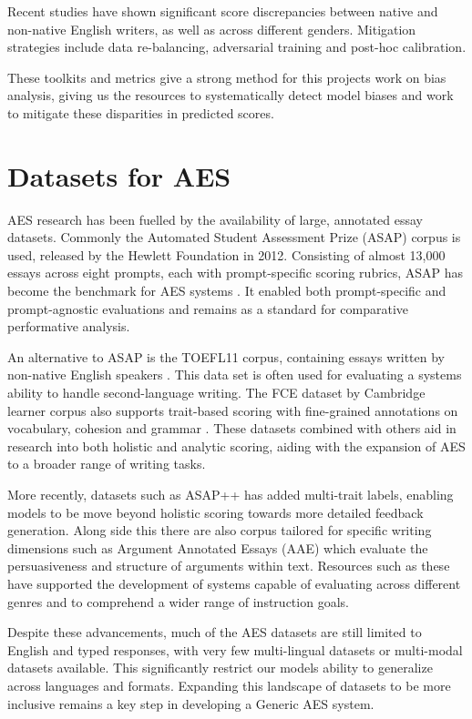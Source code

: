 \documentclass[10pt]{report}
\begin{document}
Recent studies have shown significant score discrepancies between native and non-native English writers, as well as across different genders\parencite{blodgett2020language}. Mitigation strategies include data re-balancing, adversarial training and post-hoc calibration.

These toolkits and metrics give a strong method for this projects work on bias analysis, giving us the resources to systematically detect model biases and work to mitigate these disparities in predicted scores.


\section{Datasets for AES}
AES research has been fuelled by the availability of large, annotated essay datasets. Commonly the Automated Student Assessment Prize (ASAP) corpus is used, released by the Hewlett Foundation in 2012. Consisting of almost 13,000 essays across eight prompts, each with prompt-specific scoring rubrics, ASAP has become the benchmark for AES systems \parencite{asap2012kaggle}. It enabled both prompt-specific and prompt-agnostic evaluations and remains as a standard for comparative performative analysis.

An alternative to ASAP is the TOEFL11 corpus, containing essays written by non-native English speakers \parencite{blanchard2013toefl}. This data set is often used for evaluating a systems ability to handle second-language writing. The FCE dataset by Cambridge learner corpus also supports trait-based scoring with fine-grained annotations on vocabulary, cohesion and grammar \parencite{Yannakoudakis2011}. These datasets combined with others aid in research into both holistic and analytic scoring, aiding with the expansion of AES to a broader range of writing tasks.

More recently, datasets such as ASAP++ has added multi-trait labels, enabling models to be move beyond holistic scoring towards more detailed feedback generation. Along side this there are also corpus tailored for specific writing dimensions such as Argument Annotated Essays (AAE) which evaluate the persuasiveness and structure of arguments within text. Resources such as these have supported the development of systems capable of evaluating across different genres and to comprehend a wider range of instruction goals.

Despite these advancements, much of the AES datasets are still limited to English and typed responses, with very few multi-lingual datasets or multi-modal datasets available. This significantly restrict our models ability to generalize across languages and formats. Expanding this landscape of datasets to be more inclusive remains a key step in developing a Generic AES system.
\end{document}
